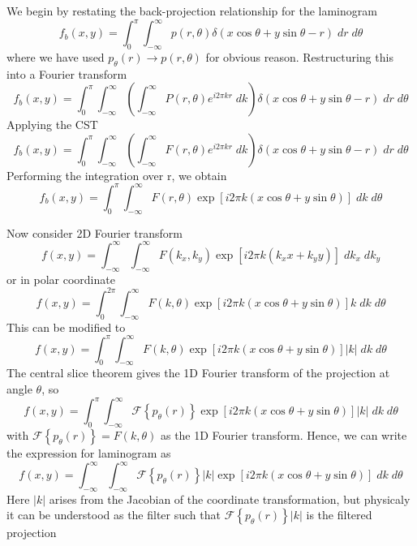 \documentclass[../../../main.tex]{subfiles}
\begin{document}
We begin by restating the back-projection relationship for the laminogram
\begin{equation*}
    f_b(x,y)=\int_{0 }^{\pi}\int_{-\infty}^{\infty} p(r,\theta)\delta(x\cos\theta+y\sin\theta -r)\;dr\;d\theta
\end{equation*}
where we have used $p_\theta(r)\rightarrow p(r,\theta)$ for obvious reason.
Restructuring this into a Fourier transform
\begin{equation*}
    f_b(x,y)=\int_{0 }^{\pi}\int_{-\infty}^{\infty} \left(\int_{-\infty}^{\infty} P(r,\theta)e^{i2\pi kr}\;dk\right)\delta(x\cos\theta+y\sin\theta -r)\;dr\;d\theta
\end{equation*}
Applying the CST
\begin{equation*}
    f_b(x,y)=\int_{0 }^{\pi}\int_{-\infty}^{\infty} \left(\int_{-\infty}^{\infty} F(r,\theta)e^{i2\pi kr}\;dk\right)\delta(x\cos\theta+y\sin\theta -r)\;dr\;d\theta
\end{equation*}
Performing the integration over r, we obtain
\begin{equation*}
    f_b(x,y)=\int_{0 }^{\pi}\int_{-\infty}^{\infty} F(r,\theta)\exp \left[ i2 \pi k \left( x \cos \theta+ y \sin \theta \right)  \right] \;dk\;d\theta
\end{equation*}

Now consider 2D Fourier transform
\begin{equation*}
    f(x,y) = \int_{-\infty }^{\infty}\int_{-\infty }^{\infty}F(k_x,k_y)\exp \left[{i 2\pi k (k_x x + k_y y)}\right]\; dk_x \; dk_y
\end{equation*}
or in polar coordinate
\begin{equation*}
    f(x,y) = \int_{0 }^{2\pi}\int_{-\infty }^{\infty}F(k,\theta) \exp \left[{i 2\pi k (x\cos\theta + y\sin\theta)}\right] k \; dk \; d\theta
\end{equation*}
This can be modified to
\begin{equation*}
    f(x,y) = \int_{0 }^{\pi}\int_{-\infty }^{\infty}F(k,\theta) \exp \left[{i 2\pi k (x\cos\theta + y\sin\theta)}\right] |k| \; dk \; d\theta
\end{equation*}
The central slice theorem gives the 1D Fourier transform of the projection at angle $\theta$, so
\begin{equation*}
    f(x,y) = \int_{0 }^{\pi}\int_{-\infty }^{\infty}\mathcal{F} \left\{ p_\theta(r) \right\}  \exp \left[{i 2\pi k (x\cos\theta + y\sin\theta)}\right] |k| \; dk \; d\theta
\end{equation*}
with $\mathcal{F} \left\{ p_\theta(r) \right\}=F(k,\theta)$ as the 1D Fourier transform.
Hence, we can write the expression for laminogram as
\begin{equation*}
    f(x,y) = \int_{-\infty }^{\infty}\int_{-\infty }^{\infty}\mathcal{F} \left\{ p_\theta(r) \right\} |k| \exp \left[{i 2\pi k (x\cos\theta + y\sin\theta)}\right] \; dk \; d\theta
\end{equation*}
Here $|k|$ arises from the Jacobian of the coordinate transformation, but physicaly it can be understood as the filter such that $\mathcal{F} \left\{ p_\theta(r) \right\} |k|$ is the filtered projection
\end{document}
